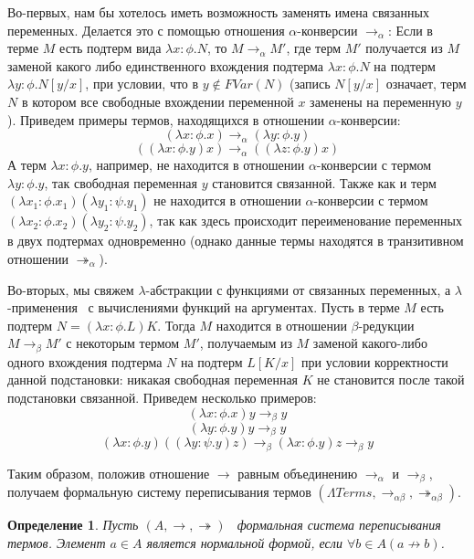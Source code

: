 \documentclass{article}[12pt]
\newtheorem{definition}{Определение}
\newcommand{\dash}{\textemdash\ }
\begin{document}
Во-первых, нам бы хотелось иметь возможность заменять имена связанных переменных. Делается
это с помощью отношения $\alpha$-конверсии $\rightarrow_\alpha$: Если в терме $M$ есть подтерм вида
$\lambda x : \phi . N$, то $M \rightarrow_\alpha M'$, где терм $M'$ получается из $M$ заменой
какого либо единственного вхождения подтерма $\lambda x : \phi . N$ на подтерм $\lambda y : \phi . N[y/x]$, при условии, что
в $y \not \in FVar(N)$ (запись $N[y/x]$ означает, терм $N$ в котором все свободные вхождении переменной
$x$ заменены на переменную $y$). Приведем примеры термов, находящихся в отношении $\alpha$-конверсии:
$$(\lambda x : \phi . x) \rightarrow_\alpha (\lambda y : \phi . y)$$
$$((\lambda x : \phi . y) x) \rightarrow_\alpha ((\lambda z : \phi . y) x)$$
А терм $\lambda x : \phi . y$, например, не находится в отношении $\alpha$-конверсии с термом
$\lambda y : \phi . y$, так свободная переменная $y$ становится связанной. Также как и
терм $(\lambda x_1 : \phi . x_1)(\lambda y_1 : \psi . y_1)$ не находится в отношении $\alpha$-конверсии
с термом $(\lambda x_2 : \phi . x_2)(\lambda y_2 : \psi . y_2)$, так как
здесь происходит переименование переменных в двух подтермах одновременно (однако данные термы
находятся в транзитивном отношении $\twoheadrightarrow_\alpha$).

Во-вторых, мы свяжем $\lambda$-абстракции с функциями от связанных переменных,
а $\lambda$-применения \dash с вычислениями функций на аргументах.
Пусть в терме $M$ есть подтерм $N = (\lambda x : \phi . L)K$. Тогда $M$ 
находится в отношении  $\beta$-редукции $M \rightarrow_\beta M'$ с некоторым термом $M'$, 
получаемым из $M$ заменой какого-либо одного вхождения подтерма $N$ на подтерм
$L[K/x]$ при условии корректности данной подстановки: никакая свободная переменная $K$ не
становится после такой подстановки связанной. Приведем несколько примеров:
$$(\lambda x : \phi . x) y \rightarrow_\beta y$$
$$(\lambda y : \phi . y) y \rightarrow_\beta y$$
$$(\lambda x : \phi . y)((\lambda y : \psi . y) z) \rightarrow_\beta (\lambda x : \phi . y) z \rightarrow_\beta y$$

Таким образом, положив отношение $\rightarrow$ равным объединению $\rightarrow_\alpha$ и $\rightarrow_\beta$,
получаем формальную систему переписывания термов $(\Lambda Terms, \rightarrow_{\alpha \beta}, \twoheadrightarrow_{\alpha \beta})$.

\begin{definition}
    \label{NormalFormDefinition}
    Пусть $(A, \rightarrow, \twoheadrightarrow)$ \dash формальная система переписывания термов.
    Элемент $a \in A$ является нормальной формой, если $\forall b \in A (a \not \rightarrow b)$.
\end{definition}
\end{document}
